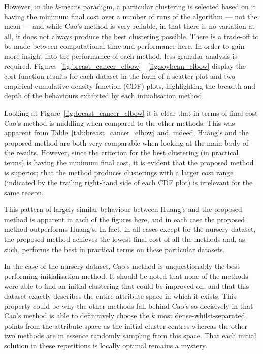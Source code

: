 However, in the \(k\)-means paradigm, a particular clustering is selected based
on it having the minimum final cost over a number of runs of the algorithm ---
not the mean --- and while Cao's method is very reliable, in that there is no
variation at all, it does not always produce the best clustering possible. There
is a trade-off to be made between computational time and performance here. In
order to gain more insight into the performance of each method, less granular
analysis is required.
Figures~\ref{fig:breast_cancer_elbow}---\ref{fig:soybean_elbow} display the
cost function results for each dataset in the form of a scatter plot and two
empirical cumulative density function (CDF) plots, highlighting the breadth and
depth of the behaviours exhibited by each initialisation method.

Looking at Figure~\ref{fig:breast_cancer_elbow} it is clear that in terms of
final cost Cao's method is middling when compared to the other methods. This
was apparent from Table~\ref{tab:breast_cancer_elbow} and, indeed, Huang's and
the proposed method are both very comparable when looking at the main body of
the results. However, since the criterion for the best clustering (in practical
terms) is having the minimum final cost, it is evident that the proposed method
is superior; that the method produces clusterings with a larger cost
range (indicated by the trailing right-hand side of each CDF plot) is irrelevant
for the same reason.

This pattern of largely similar behaviour between Huang's and the proposed
method is apparent in each of the figures here, and in each case the proposed
method outperforms Huang's. In fact, in all cases except for the nursery
dataset, the proposed method achieves the lowest final cost of all the methods
and, as such, performs the best in practical terms on these particular datasets.

In the case of the nursery dataset, Cao's method is unquestionably the best
performing initialisation method. It should be noted that none of the
methods were able to find an initial clustering that could be improved on, and
that this dataset exactly describes the entire attribute space in which it
exists. This property could be why the other methods fall behind Cao's so
decisively in that Cao's method is able to definitively choose the \(k\) most
dense-whilst-separated points from the attribute space as the initial cluster
centres whereas the other two methods are in essence randomly sampling from this
space. That each initial solution in these repetitions is locally optimal
remains a mystery.

